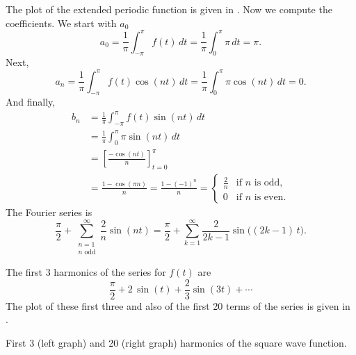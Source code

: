 \begin{example}
\pagebreak[2]
The plot of the extended periodic function is given in
.
Now we compute the coefficients.  We start with $a_0$
\begin{equation*}
a_0 = \frac{1}{\pi} \int_{-\pi}^\pi f(t) \,dt
= \frac{1}{\pi} \int_{0}^\pi \pi \,dt = \pi .
\end{equation*}
Next,
\begin{equation*}
a_n = \frac{1}{\pi} \int_{-\pi}^\pi f(t) \cos (nt) \,dt 
= \frac{1}{\pi} \int_{0}^\pi \pi \cos (nt) \,dt = 0 .
\end{equation*}
And finally,
\begin{equation*}
\begin{split}
b_n & = \frac{1}{\pi} \int_{-\pi}^\pi f(t) \sin (nt) \,dt \\
& = \frac{1}{\pi} \int_{0}^\pi \pi \sin (nt) \,dt \\
& = \left[ \frac{- \cos (nt)}{n} \right]_{t=0}^\pi \\
& = \frac{1 - \cos (\pi n)}{n}
= \frac{1 - {(-1)}^n}{n}
=
\begin{cases}
\frac{2}{n} & \text{if } n \text{ is odd} , \\
0 & \text{if } n \text{ is even} .
\end{cases}
\end{split}
\end{equation*}
The Fourier series is
\begin{equation*}
\frac{\pi}{2} +  \sum_{\substack{n=1\\n \text{ odd}}}^\infty
\frac{2}{n} 
\sin (n t)
=
\frac{\pi}{2} + \sum_{k=1}^\infty
\frac{2}{2k-1} 
\sin \bigl( (2k-1)\, t \bigr) .
\end{equation*}

The first 3 harmonics of the series for $f(t)$ are
\begin{equation*}
\frac{\pi}{2}
+
2 \, \sin (t)
+
\frac{2}{3}  \sin (3t)
+ \cdots
\end{equation*}
The plot of these first three and also of the first 20 terms of the series
is given in
.

\begin{myfig}
\capstart
\caption{First 3 (left graph) and 20 (right graph) harmonics of the
square wave function.\label{ts:squarewavefsfig}}
\end{myfig}
\end{example}

